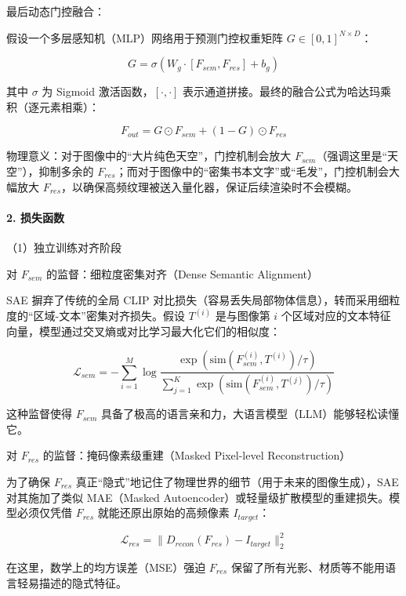最后动态门控融合：

假设一个多层感知机（MLP）网络用于预测门控权重矩阵 \(G\in[0,1]^{N\times D}\)：

\[
G=\sigma(W_g\cdot [F_{sem},F_{res}]+b_g)
\]

其中 \(\sigma\) 为 Sigmoid 激活函数，\([\cdot,\cdot]\) 表示通道拼接。最终的融合公式为哈达玛乘积（逐元素相乘）：

\[
F_{out}=G\odot F_{sem}+(1-G)\odot F_{res}
\]

物理意义：对于图像中的``大片纯色天空''，门控机制会放大 \(F_{sem}\)（强调这里是``天空''），抑制多余的 \(F_{res}\)；而对于图像中的``密集书本文字''或``毛发''，门控机制会大幅放大 \(F_{res}\)，以确保高频纹理被送入量化器，保证后续渲染时不会模糊。

\hypertarget{ux635fux5931ux51fdux6570}{%
\paragraph{2. 损失函数}\label{ux635fux5931ux51fdux6570}}

（1）独立训练对齐阶段

对 \(F_{sem}\) 的监督：细粒度密集对齐（Dense Semantic Alignment）

SAE 摒弃了传统的全局 CLIP 对比损失（容易丢失局部物体信息），转而采用细粒度的``区域-文本''密集对齐损失。假设 \(T^{(i)}\) 是与图像第 \(i\) 个区域对应的文本特征向量，模型通过交叉熵或对比学习最大化它们的相似度：

\[
\mathcal{L}_{sem}=-\sum_{i=1}^{M}\log
\frac{\exp(\mathrm{sim}(F_{sem}^{(i)},T^{(i)})/\tau)}
{\sum_{j=1}^{K}\exp(\mathrm{sim}(F_{sem}^{(i)},T^{(j)})/\tau)}
\]

这种监督使得 \(F_{sem}\) 具备了极高的语言亲和力，大语言模型（LLM）能够轻松读懂它。

对 \(F_{res}\) 的监督：掩码像素级重建（Masked Pixel-level Reconstruction）

为了确保 \(F_{res}\) 真正``隐式''地记住了物理世界的细节（用于未来的图像生成），SAE 对其施加了类似 MAE（Masked Autoencoder）或轻量级扩散模型的重建损失。模型必须仅凭借 \(F_{res}\) 就能还原出原始的高频像素 \(I_{target}\)：

\[
\mathcal{L}_{res}=\lVert D_{recon}(F_{res})-I_{target}\rVert_2^2
\]

在这里，数学上的均方误差（MSE）强迫 \(F_{res}\) 保留了所有光影、材质等不能用语言轻易描述的隐式特征。

